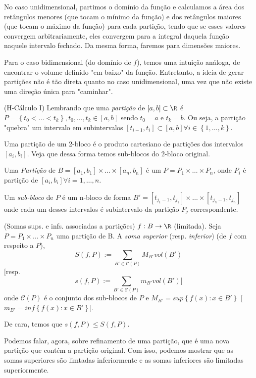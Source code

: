 No caso unidimensional, partimos o domínio da função e calculamos a área dos retângulos menores (que tocam o mínimo da função) e dos retângulos maiores (que tocam o máximo da função) para cada partição, tendo que se esses valores convergem arbitrariamente, eles convergem para a integral daquela função naquele intervalo fechado. Da mesma forma, faremos para dimensões maiores.

Para o caso bidimensional (do domínio de $f$), temos uma intuição análoga, de encontrar o volume definido "em baixo" da função. Entretanto, a ideia de gerar partições não é tão direta quanto no caso unidimensional, uma vez que não existe uma direção única para "caminhar".

\begin{note}
    (H-Cálculo I) Lembrando que uma \emph{partição} de $\left[ a,b \right] \subset \R$ é $P=\left\{ t_0<\ldots<t_k \right\}, t_0,\ldots,t_k \in \left[ a,b \right] $ sendo $t_0=a$ e $t_k=b$. Ou seja, a partição "quebra" um intervalo em subintervalos $\left[ t_{i-1}, t_i \right] \subset \left[ a,b \right] \forall i\in \left\{ 1,\ldots,k \right\} $.
\end{note}

Uma partição de um 2-bloco é o produto cartesiano de partições dos intervalos $\left[ a_i,b_i \right]$. Veja que dessa forma temos sub-blocos do 2-bloco original.

\begin{definition}
    Uma \emph{Partição} de $B=\left[ a_1,b_1 \right]\times \ldots\times \left[ a_n,b_n \right]  $ é um $P=P_1\times \ldots\times P_n$, onde $P_i$ é partição de $\left[ a_i,b_i \right] \forall i=1,\ldots,n$.
    
    Um \emph{sub-bloco} de $P$ é um n-bloco de forma $B' = \left[ t_{j_1 -1},t_{j_1} \right] \times \ldots\times \left[ t_{j_n-1}, t_{j_n} \right] $ onde cada um desses intervalos é subintervalo da partição $P_{j}$ correspondente.
\end{definition}

\begin{definition}
    (Somas sups. e infs. associadas a partições) $f: B\to \R$ (limitada). Seja $P=P_1\times \ldots\times P_n$ uma partição de B. A \emph{soma superior} (resp. \emph{inferior}) (de $f$ com respeito a $P$), \[
	S\left( f,P \right) := \sum_{B'\in \mathcal{C}\left( P \right) } M_{B'}vol\left( B' \right) 
    \] [resp. \[
	s\left( f,P \right) := \sum_{B'\in \mathcal{C}\left( P \right) } m_{B'}vol\left( B' \right) 
    ]\] onde $\mathcal{C}\left( P \right) $ é o conjunto dos sub-blocos de $P$ e $M_{B'} = sup\left\{ f(x): x\in B' \right\} $ [$m_{B'}=inf\left\{ f(x):x\in B' \right\} $].
\end{definition}

De cara, temos que $s\left( f,P \right) \le S\left( f,P \right)$.

Podemos falar, agora, sobre refinamento de uma partição, que é uma nova partição que contém a partição original. Com isso, podemos mostrar que as somas superiores são limtadas inferiormente e as somas inferiores são limitadas superiormente.

